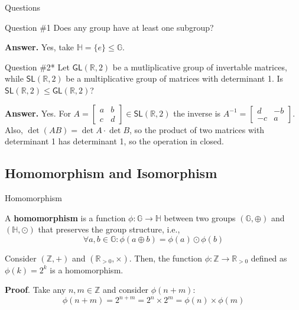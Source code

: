 \documentclass{beamer}
\begin{document}
  \begin{frame}{Questions}
    \begin{alertblock}{Question \#1}
      Does any group have at least one subgroup?
    \end{alertblock}

    \textbf{Answer.} Yes, take $\mathbb{H} = \{e\} \leq \mathbb{G}$.

    \begin{alertblock}{Question \#2*}
      Let $\mathsf{GL}(\mathbb{R},2)$ be a mutliplicative group of invertable matrices, while $\mathsf{SL}(\mathbb{R},2)$ be a multiplicative group of matrices with determinant 1. Is $\mathsf{SL}(\mathbb{R},2) \leq \mathsf{GL}(\mathbb{R},2)$?
    \end{alertblock}

    \textbf{Answer.} Yes. For $A = \begin{bmatrix}
      a & b \\
      c & d
    \end{bmatrix} \in \mathsf{SL}(\mathbb{R},2)$ the inverse is $A^{-1} = \begin{bmatrix}
      d & -b \\ -c & a
    \end{bmatrix}$. Also, $\det (AB) = \det A \cdot \det B$, so the product of two matrices with determinant 1 has determinant 1, so the operation in closed.
  \end{frame}

  \subsection{Homomorphism and Isomorphism}

  \begin{frame}{Homomorphism}
    \begin{definition}
      A \textbf{homomorphism} is a function $\phi: \mathbb{G} \rightarrow \mathbb{H}$ between two groups $(\mathbb{G}, \oplus)$ and $(\mathbb{H}, \odot)$ that preserves the group structure, i.e., 
      \begin{equation*}
        \forall a,b \in \mathbb{G}: \phi(a \oplus b) = \phi(a) \odot \phi(b)
      \end{equation*}
    \end{definition}

    \begin{example}
      Consider $(\mathbb{Z}, +)$ and $(\mathbb{R}_{>0}, \times)$. Then, the function $\phi: \mathbb{Z} \rightarrow \mathbb{R}_{>0}$ defined as $\phi(k) = 2^k$ is a homomorphism.
    \end{example}

    \textbf{Proof}. Take any $n,m \in \mathbb{Z}$ and consider $\phi(n+m)$:
    \begin{equation*}
      \phi(n+m) = 2^{n+m} = 2^n \times 2^m = \phi(n) \times \phi(m)
    \end{equation*}
  \end{frame}
\end{document}
